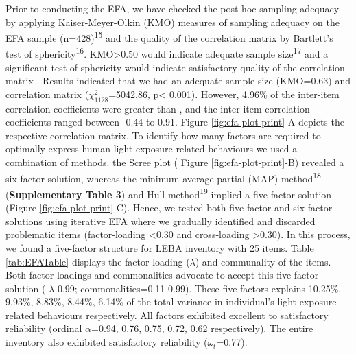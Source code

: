 \documentclass[
  man]{apa6}
\begin{document}
Prior to conducting the EFA, we have checked the post-hoc sampling adequacy by applying Kaiser-Meyer-Olkin (KMO) measures of sampling adequacy on the EFA sample (n=428)\textsuperscript{15} and the quality of the correlation matrix by Bartlett's test of sphericity\textsuperscript{16}. KMO\textgreater0.50 would indicate adequate sample size\textsuperscript{17} and a significant test of sphericity would indicate satisfactory quality of the correlation matrix . Results indicated that we had an adequate sample size (KMO=0.63) and correlation matrix (\(\chi^2_{1128}\)=5042.86, p\textless{} 0.001). However, 4.96\% of the inter-item correlation coefficients were greater than \textbar, and the inter-item correlation coefficients ranged between -0.44 to 0.91. Figure \ref{fig:efa-plot-print}-A depicts the respective correlation matrix. To identify how many factors are required to optimally express human light exposure related behaviours we used a combination of methods. the Scree plot ( Figure \ref{fig:efa-plot-print}-B) revealed a six-factor solution, whereas the minimum average partial (MAP) method\textsuperscript{18} (\textbf{Supplementary Table 3}) and Hull method\textsuperscript{19} implied a five-factor solution (Figure \ref{fig:efa-plot-print}-C). Hence, we tested both five-factor and six-factor solutions using iterative EFA where we gradually identified and discarded problematic items (factor-loading \textless0.30 and cross-loading \textgreater0.30). In this process, we found a five-factor structure for LEBA inventory with 25 items. Table \ref{tab:EFATable} displays the factor-loading (\(\lambda\)) and communality of the items. Both factor loadings and commonalities advocate to accept this five-factor solution ( \textbar{}\(\lambda\)-0.99; commonalities=0.11-0.99). These five factors explains 10.25\%, 9.93\%, 8.83\%, 8.44\%, 6.14\% of the total variance in individual's light exposure related behaviours respectively. All factors exhibited excellent to satisfactory reliability (ordinal \(\alpha\)=0.94, 0.76, 0.75, 0.72, 0.62 respectively). The entire inventory also exhibited satisfactory reliability (\(\omega_t\)=0.77).
\end{document}

